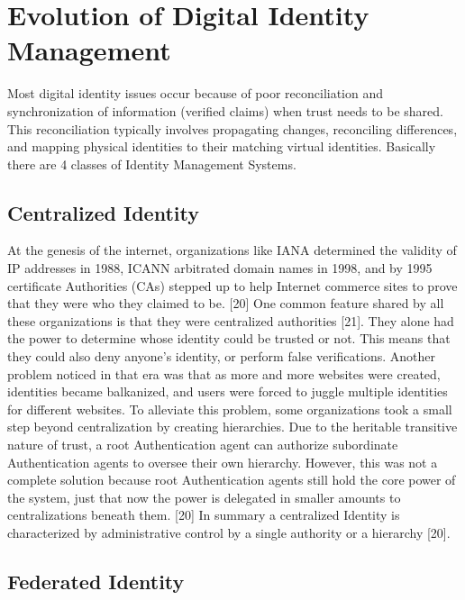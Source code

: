 \section{Evolution of Digital Identity Management}

Most digital identity issues occur because of poor reconciliation and synchronization of information (verified claims) when trust needs to be shared. This reconciliation typically involves propagating changes, reconciling differences, and mapping physical identities to their matching virtual identities. Basically there are 4 classes of Identity Management Systems.

\subsection{Centralized Identity}

At the genesis of the internet, organizations like IANA determined the validity of IP addresses in 1988, ICANN arbitrated domain names in 1998, and by 1995 certificate Authorities (CAs) stepped up to help Internet commerce sites to prove that they were who they claimed to be. [20] One common feature shared by all these organizations is that they were centralized authorities [21]. They alone had the power to determine whose identity could be trusted or not. This means that they could also deny anyone’s identity, or perform false verifications. Another problem noticed in that era was that as more and more websites were created, identities became balkanized, and users were forced to juggle multiple identities for different websites. To alleviate this problem, some organizations took a small step beyond centralization by creating hierarchies. Due to the heritable transitive nature of trust, a root Authentication agent can authorize subordinate Authentication agents to oversee their own hierarchy. However, this was not a complete solution because root Authentication agents still hold the core power of the system, just that now the power is delegated in smaller amounts to centralizations beneath them. [20] In summary a centralized Identity is characterized by administrative control by a single authority or a hierarchy [20].

\subsection{Federated Identity}

